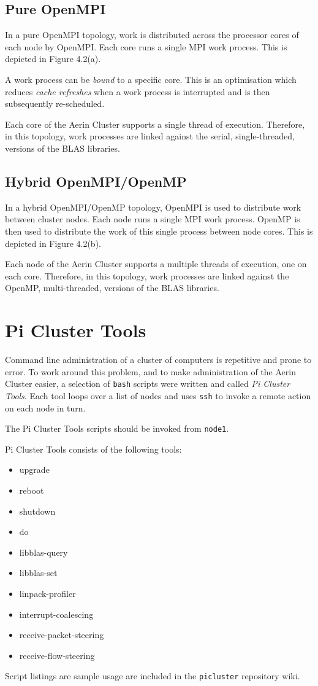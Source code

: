 %
%
\subsection{Pure OpenMPI}

In a pure OpenMPI topology, work is distributed across the processor cores of each node by OpenMPI. Each core runs a single MPI work process. This is depicted in Figure 4.2(a).

A work process can be \emph{bound} to a specific core. This is an optimisation which reduces \emph{cache refreshes} when a work process is interrupted and is then subsequently re-scheduled.

Each core of the Aerin Cluster supports a single thread of execution. Therefore, in this topology, work processes are linked against the serial, single-threaded, versions of the BLAS libraries.


%
%
\subsection{Hybrid OpenMPI/OpenMP}
In a hybrid OpenMPI/OpenMP topology, OpenMPI is used to distribute work between cluster nodes. Each node runs a single MPI work process. OpenMP is then used to distribute the work of this single process between node cores. This is depicted in Figure 4.2(b).

Each node of the Aerin Cluster supports a multiple threads of execution, one on each core. Therefore, in this topology, work processes are linked against the OpenMP, multi-threaded, versions of the BLAS libraries.


%
%
\section{Pi Cluster Tools}

Command line administration of a cluster of computers is repetitive and prone to error. To work around this problem, and to make administration of the Aerin Cluster easier, a selection of \verb|bash| scripts were written and called \emph{Pi Cluster Tools}. Each tool loops over a list of nodes and uses \verb|ssh| to invoke a remote action on each node in turn.

The Pi Cluster Tools scripts should be invoked from \verb|node1|.

Pi Cluster Tools consists of the following tools:

\begin{itemize}
\item upgrade
\item reboot
\item shutdown
\item do
\item libblas-query
\item libblas-set
\item linpack-profiler
\item interrupt-coalescing
\item receive-packet-steering
\item receive-flow-steering
\end{itemize}

Script listings are sample usage are included in the \verb|picluster| repository wiki.
